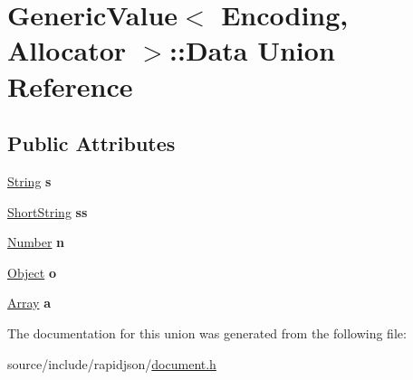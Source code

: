 \hypertarget{union_generic_value_1_1_data}{}\section{Generic\+Value$<$ Encoding, Allocator $>$\+:\+:Data Union Reference}
\label{union_generic_value_1_1_data}
\subsection*{Public Attributes}
\begin{DoxyCompactItemize}
\item 
\hypertarget{union_generic_value_1_1_data_a6872a4b93763944063b425e6c001ed2b}{}\hyperlink{struct_generic_value_1_1_string}{String} {\bfseries s}\label{union_generic_value_1_1_data_a6872a4b93763944063b425e6c001ed2b}

\item 
\hypertarget{union_generic_value_1_1_data_a410e39a5dc296eb3b152b54193740e4c}{}\hyperlink{struct_generic_value_1_1_short_string}{Short\+String} {\bfseries ss}\label{union_generic_value_1_1_data_a410e39a5dc296eb3b152b54193740e4c}

\item 
\hypertarget{union_generic_value_1_1_data_a243007cce2f4b75bea3e3c1ee4c3c239}{}\hyperlink{union_generic_value_1_1_number}{Number} {\bfseries n}\label{union_generic_value_1_1_data_a243007cce2f4b75bea3e3c1ee4c3c239}

\item 
\hypertarget{union_generic_value_1_1_data_a15c6847aa3272560aaff5e7ed4320a7f}{}\hyperlink{struct_generic_value_1_1_object}{Object} {\bfseries o}\label{union_generic_value_1_1_data_a15c6847aa3272560aaff5e7ed4320a7f}

\item 
\hypertarget{union_generic_value_1_1_data_a1935b99b33ec9deff9f6360f8fa7b812}{}\hyperlink{struct_generic_value_1_1_array}{Array} {\bfseries a}\label{union_generic_value_1_1_data_a1935b99b33ec9deff9f6360f8fa7b812}

\end{DoxyCompactItemize}


The documentation for this union was generated from the following file\+:\begin{DoxyCompactItemize}
\item 
source/include/rapidjson/\hyperlink{document_8h}{document.\+h}\end{DoxyCompactItemize}
